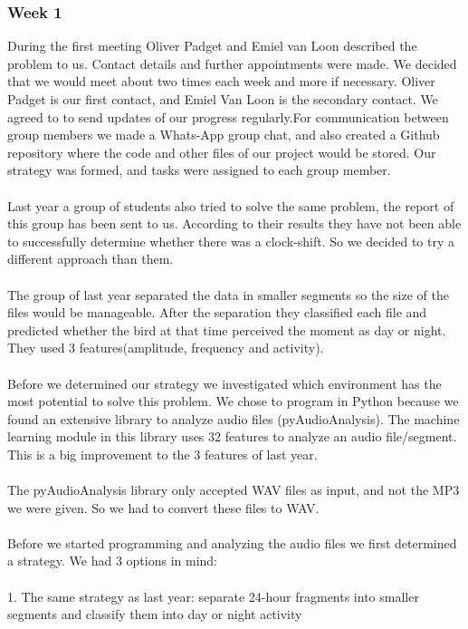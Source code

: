 \documentclass[a4paper]{article}
\begin{document}
\subsubsection*{Week 1}
During the first meeting Oliver Padget and Emiel van Loon described the problem to us. Contact details and further appointments were made. We decided that we would meet about two times each week and more if necessary. Oliver Padget is our first contact, and Emiel Van Loon is the secondary contact. We agreed to to send updates of our progress regularly.For communication between group members we made a Whats-App group chat, and also created a Github repository where the code and other files of our project would be stored. Our strategy was formed, and tasks were assigned to each group member.\\\\
Last year a group of students also tried to solve the same problem, the report of this group has been sent to us. According to their results they have not been able to successfully determine whether there was a clock-shift. So we decided to try a different approach than them.
\\\\
The group of last year separated the data in smaller segments so the size of the files would be manageable. After the separation they classified each file and predicted whether the bird at that time perceived the moment as day or night. They used 3 features(amplitude, frequency and activity).\\\\
Before we determined our strategy we investigated which environment has the most potential to solve this problem. We chose to program in Python because we found an extensive library to analyze audio files (pyAudioAnalysis). The machine learning module in this library uses 32 features to analyze an audio file/segment. This is a big improvement to the 3 features of last year.\\\\
The pyAudioAnalysis library only accepted WAV files as input, and not the MP3 we were given. So we had to convert these files to WAV.\\\\
Before we started programming and analyzing the audio files we first determined a strategy. We had 3 options in mind:\\\\
1. The same strategy as last year: separate 24-hour fragments into smaller segments and classify them into day or night activity\\
\end{document}
